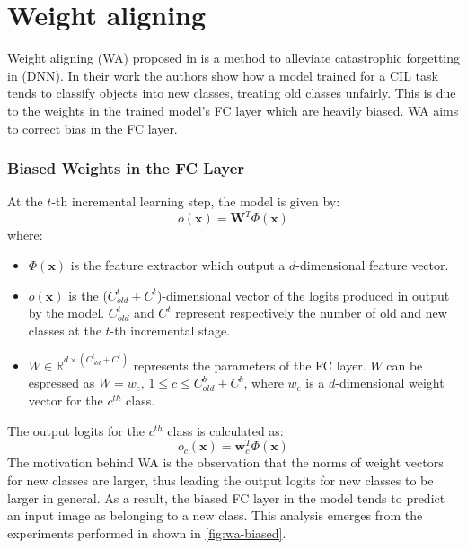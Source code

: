 \section{Weight aligning}
Weight aligning (WA) proposed in \cite{zhao2020maintaining} is a method to alleviate catastrophic forgetting in (DNN). In their work the authors show how a model trained for a CIL task tends
to classify objects into new classes, treating old classes unfairly. This is due to the weights
in the trained model's FC layer which are heavily biased. WA aims to correct bias in the FC layer.

\subsubsection{Biased Weights in the FC Layer}
\label{sec:wa-biased}
At the $t$-th incremental learning step, the model is given by:
\begin{equation}
    o(\textbf{x}) = \textbf{W}^T \Phi(\textbf{x})
\end{equation}
where:
\begin{itemize}
    \item $\Phi(\textbf{x})$ is the feature extractor which output a $d$-dimensional feature vector.
    \item $o(\textbf{x})$ is the ($C_{old}^t + C^t$)-dimensional vector of the logits produced in output by the model. $C_{old}^t$ and $C^t$ represent respectively the number of old and new classes at the $t$-th incremental stage. 
    \item $W \in \mathbb{R}^{d \times (C_{old}^t + C^t)}$ represents the parameters of the FC layer. $W$ can be espressed as $W = {w_c, \, 1 \leq c \leq C_{old}^b + C^b}$, where $w_c$ is a $d$-dimensional weight vector for the $c^{th}$ class.
\end{itemize}
The output logits for the $c^{th}$ class is calculated as:
\begin{equation}
    o_c(\textbf{x}) = \textbf{w}_c^T \Phi (\textbf{x})
\end{equation}
The motivation behind WA is the observation that the norms of weight vectors for new classes are larger, thus leading the output logits for new classes to be larger in general. As a result, the biased FC layer in the model tends to predict an input image as belonging to a new class. This analysis emerges from the experiments performed in \cite{zhao2020maintaining} shown in \autoref{fig:wa-biased}.
